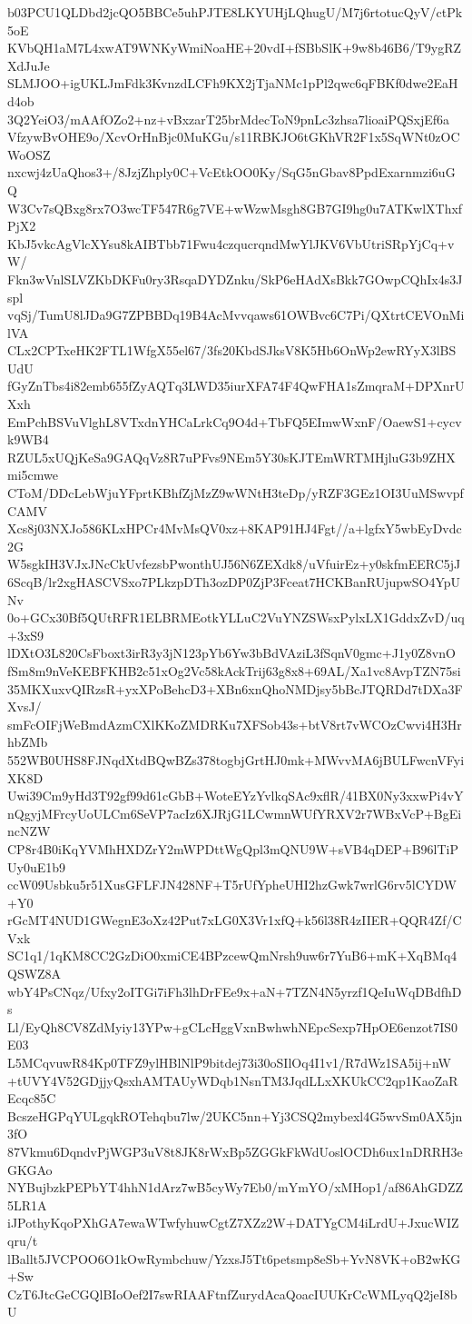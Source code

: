 b03PCU1QLDbd2jcQO5BBCe5uhPJTE8LKYUHjLQhugU/M7j6rtotucQyV/ctPk5oE
KVbQH1aM7L4xwAT9WNKyWmiNoaHE+20vdI+fSBbSlK+9w8b46B6/T9ygRZXdJuJe
SLMJOO+igUKLJmFdk3KvnzdLCFh9KX2jTjaNMc1pPl2qwc6qFBKf0dwe2EaHd4ob
3Q2YeiO3/mAAfOZo2+nz+vBxzarT25brMdecToN9pnLc3zhsa7lioaiPQSxjEf6a
VfzywBvOHE9o/XcvOrHnBjc0MuKGu/s11RBKJO6tGKhVR2F1x5SqWNt0zOCWoOSZ
nxcwj4zUaQhos3+/8JzjZhply0C+VcEtkOO0Ky/SqG5nGbav8PpdExarnmzi6uGQ
W3Cv7sQBxg8rx7O3wcTF547R6g7VE+wWzwMsgh8GB7GI9hg0u7ATKwlXThxfPjX2
KbJ5vkcAgVlcXYsu8kAIBTbb71Fwu4czqucrqndMwYlJKV6VbUtriSRpYjCq+vW/
Fkn3wVnlSLVZKbDKFu0ry3RsqaDYDZnku/SkP6eHAdXsBkk7GOwpCQhIx4s3Jspl
vqSj/TumU8lJDa9G7ZPBBDq19B4AcMvvqaws61OWBvc6C7Pi/QXtrtCEVOnMilVA
CLx2CPTxeHK2FTL1WfgX55el67/3fs20KbdSJksV8K5Hb6OnWp2ewRYyX3lBSUdU
fGyZnTbs4i82emb655fZyAQTq3LWD35iurXFA74F4QwFHA1sZmqraM+DPXnrUXxh
EmPchBSVuVlghL8VTxdnYHCaLrkCq9O4d+TbFQ5EImwWxnF/OaewS1+cycvk9WB4
RZUL5xUQjKeSa9GAQqVz8R7uPFvs9NEm5Y30sKJTEmWRTMHjluG3b9ZHXmi5cmwe
CToM/DDcLebWjuYFprtKBhfZjMzZ9wWNtH3teDp/yRZF3GEz1OI3UuMSwvpfCAMV
Xcs8j03NXJo586KLxHPCr4MvMsQV0xz+8KAP91HJ4Fgt//a+lgfxY5wbEyDvdc2G
W5sgkIH3VJxJNcCkUvfezsbPwonthUJ56N6ZEXdk8/uVfuirEz+y0skfmEERC5jJ
6ScqB/lr2xgHASCVSxo7PLkzpDTh3ozDP0ZjP3Fceat7HCKBanRUjupwSO4YpUNv
0o+GCx30Bf5QUtRFR1ELBRMEotkYLLuC2VuYNZSWsxPylxLX1GddxZvD/uq+3xS9
lDXtO3L820CsFboxt3irR3y3jN123pYb6Yw3bBdVAziL3fSqnV0gmc+J1y0Z8vnO
fSm8m9nVeKEBFKHB2c51xOg2Vc58kAckTrij63g8x8+69AL/Xa1vc8AvpTZN75si
35MKXuxvQIRzsR+yxXPoBehcD3+XBn6xnQhoNMDjsy5bBcJTQRDd7tDXa3FXvsJ/
smFcOIFjWeBmdAzmCXlKKoZMDRKu7XFSob43s+btV8rt7vWCOzCwvi4H3HrhbZMb
552WB0UHS8FJNqdXtdBQwBZs378togbjGrtHJ0mk+MWvvMA6jBULFwcnVFyiXK8D
Uwi39Cm9yHd3T92gf99d61cGbB+WoteEYzYvlkqSAc9xflR/41BX0Ny3xxwPi4vY
nQgyjMFrcyUoULCm6SeVP7acIz6XJRjG1LCwmnWUfYRXV2r7WBxVcP+BgEincNZW
CP8r4B0iKqYVMhHXDZrY2mWPDttWgQpl3mQNU9W+sVB4qDEP+B96lTiPUy0uE1b9
ccW09Usbku5r51XusGFLFJN428NF+T5rUfYpheUHI2hzGwk7wrlG6rv5lCYDW+Y0
rGcMT4NUD1GWegnE3oXz42Put7xLG0X3Vr1xfQ+k56l38R4zIIER+QQR4Zf/CVxk
SC1q1/1qKM8CC2GzDiO0xmiCE4BPzcewQmNrsh9uw6r7YuB6+mK+XqBMq4QSWZ8A
wbY4PsCNqz/Ufxy2oITGi7iFh3lhDrFEe9x+aN+7TZN4N5yrzf1QeIuWqDBdfhDs
Ll/EyQh8CV8ZdMyiy13YPw+gCLcHggVxnBwhwhNEpcSexp7HpOE6enzot7IS0E03
L5MCqvuwR84Kp0TFZ9ylHBlNlP9bitdej73i30oSIlOq4I1v1/R7dWz1SA5ij+nW
+tUVY4V52GDjjyQsxhAMTAUyWDqb1NsnTM3JqdLLxXKUkCC2qp1KaoZaREcqc85C
BcszeHGPqYULgqkROTehqbu7lw/2UKC5nn+Yj3CSQ2mybexl4G5wvSm0AX5jn3fO
87Vkmu6DqndvPjWGP3uV8t8JK8rWxBp5ZGGkFkWdUoslOCDh6ux1nDRRH3eGKGAo
NYBujbzkPEPbYT4hhN1dArz7wB5cyWy7Eb0/mYmYO/xMHop1/af86AhGDZZ5LR1A
iJPothyKqoPXhGA7ewaWTwfyhuwCgtZ7XZz2W+DATYgCM4iLrdU+JxucWIZqru/t
lBallt5JVCPOO6O1kOwRymbchuw/YzxsJ5Tt6petsmp8eSb+YvN8VK+oB2wKG+Sw
CzT6JtcGeCGQlBIoOef2I7swRIAAFtnfZurydAcaQoacIUUKrCcWMLyqQ2jeI8bU
